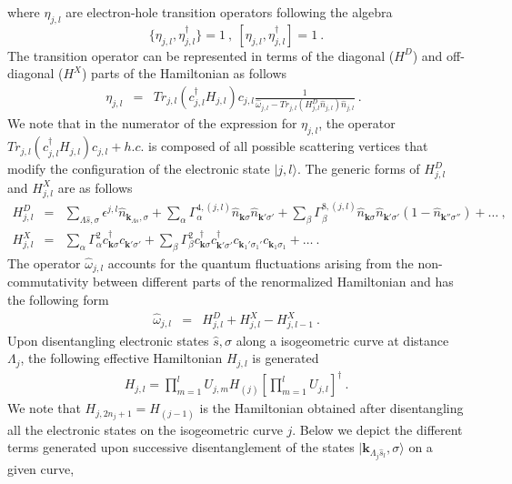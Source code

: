 \documentclass[aps,prb,preprint,groupedaddress]{revtex4-2}
\begin{document}
where $\eta_{j,l}$ are electron-hole transition operators following the algebra
\begin{equation}
\lbrace\eta_{j,l},\eta_{j,l}^{\dagger}\rbrace=1~,~\left[\eta_{j,l},\eta_{j,l}^{\dagger}\right]=1~.
\end{equation}
The transition operator can be represented in terms of the diagonal ($H^{D}$) and off-diagonal ($H^{X}$) parts of the Hamiltonian as follows 
\begin{eqnarray}
\eta_{j,l}&=&Tr_{j,l}(c^{\dagger}_{j,l}H_{j,l})c_{j,l}\frac{1}{\hat{\omega}_{j,l}-Tr_{j,l}(H_{j,l}^{D}\hat{n}_{j,l})\hat{n}_{j,l}}~.~~\label{e-TransOp}
\end{eqnarray}
We note that in the numerator of the expression for $\eta_{j,l}$, the operator $Tr_{j,l}(c^{\dagger}_{j,l}H_{j,l})c_{j,l}+h.c.$ is composed of all possible scattering vertices that modify the configuration of the electronic state $|j,l\rangle$. The generic forms of $H^{D}_{j,l}$ and $H^{X}_{j,l}$ are as follows
\begin{eqnarray}
H^{D}_{j,l}&=&\sum_{\Lambda\hat{s},\sigma}\epsilon^{j,l}\hat{n}_{\mathbf{k}_{\Lambda\hat{s}},\sigma}+\sum_{\alpha}\Gamma_{\alpha}^{4,(j,l)}\hat{n}_{\mathbf{k}\sigma}\hat{n}_{\mathbf{k}'\sigma'}+\sum_{\beta}\Gamma_{\beta}^{8,(j,l)}\hat{n}_{\mathbf{k}\sigma}\hat{n}_{\mathbf{k}'\sigma'}(1-\hat{n}_{\mathbf{k}''\sigma''})+\ldots~,\nonumber\\
H^{X}_{j,l}&=&\sum_{\alpha}\Gamma_{\alpha}^{2}c^{\dagger}_{\mathbf{k}\sigma}c_{\mathbf{k}'\sigma'}+\sum_{\beta}\Gamma_{\beta}^{2}c^{\dagger}_{\mathbf{k}\sigma}c^{\dagger}_{\mathbf{k}'\sigma'}c_{\mathbf{k}_{1}'\sigma_{1}'}c_{\mathbf{k}_{1}\sigma_{1}}+\ldots~.
\end{eqnarray}
The operator $\hat{\omega}_{j,l}$ accounts for the quantum fluctuations arising from the non-commutativity between different parts of the renormalized Hamiltonian and has the following form~\cite{anirbanurg1}
\begin{eqnarray}
\hat{\omega}_{j,l}&=&H^{D}_{j,l}+H^{X}_{j,l}-H^{X}_{j,l-1}~.\label{qfOp}
\end{eqnarray}
Upon disentangling electronic states $\hat{s},\sigma$ along a isogeometric curve at distance $\Lambda_{j}$, the following effective Hamiltonian $H_{j,l}$ is generated 
\begin{eqnarray}
H_{j,l}=\prod_{m=1}^{l}U_{j,m}H_{(j)}[\prod_{m=1}^{l}U_{j,l}]^{\dagger}~.
\end{eqnarray}
We note that $H_{j,2n_{j}+1}=H_{(j-1)}$ is the Hamiltonian obtained after disentangling all the electronic states on the isogeometric curve $j$. Below we depict the different terms generated upon successive disentanglement of the states $|\mathbf{k}_{\Lambda_{j}\hat{s}_{l}},\sigma\rangle$ on a given curve,
\end{document}
